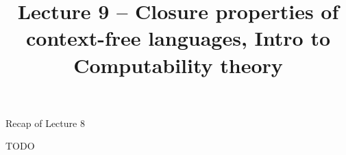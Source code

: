 \documentclass[handout]{beamer}
\title{Lecture 9 -- Closure properties of context-free languages, Intro to Computability theory}
\begin{document}
\frame{\titlepage}


\begin{frame}{Recap of Lecture 8}
	
    TODO
	
\end{frame}
\end{document}
